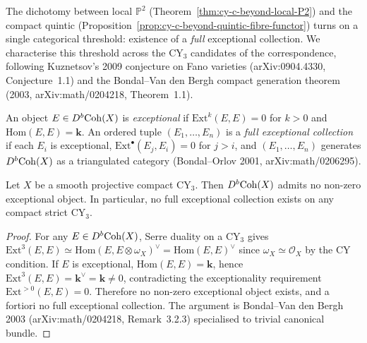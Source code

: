 The dichotomy between local $\mathbb{P}^2$ (Theorem~\ref{thm:cy-c-beyond-local-P2})
and the compact quintic
(Proposition~\ref{prop:cy-c-beyond-quintic-fibre-functor}) turns on a single
categorical threshold: existence of a \emph{full} exceptional collection. We
characterise this threshold across the CY$_3$ candidates of the correspondence,
following Kuznetsov's 2009 conjecture on Fano varieties
(arXiv:0904.4330, Conjecture~1.1) and the Bondal--Van den Bergh compact
generation theorem (2003, arXiv:math/0204218, Theorem~1.1).

\begin{definition}
\label{def:cy-c-beyond-full-exc-coll}
An object $E \in D^b\mathrm{Coh}(X)$ is \emph{exceptional} if
$\mathrm{Ext}^k(E, E) = 0$ for $k > 0$ and $\mathrm{Hom}(E, E) = \mathbf k$.
An ordered tuple $(E_1, \ldots, E_n)$ is a \emph{full exceptional collection}
if each $E_i$ is exceptional, $\mathrm{Ext}^\bullet(E_j, E_i) = 0$ for $j > i$,
and $(E_1, \ldots, E_n)$ generates $D^b\mathrm{Coh}(X)$ as a triangulated category
(Bondal--Orlov 2001, arXiv:math/0206295).
\end{definition}

\begin{lemma}
\label{lem:cy-c-beyond-cy3-obstruction}
Let $X$ be a smooth projective compact CY$_3$. Then $D^b\mathrm{Coh}(X)$ admits no
non-zero exceptional object. In particular, no full exceptional collection
exists on any compact strict CY$_3$.
\end{lemma}

\begin{proof}
For any $E \in D^b\mathrm{Coh}(X)$, Serre duality on a CY$_3$ gives
$\mathrm{Ext}^3(E, E) \simeq \mathrm{Hom}(E, E \otimes \omega_X)^\vee =
\mathrm{Hom}(E, E)^\vee$ since $\omega_X \simeq \mathcal O_X$ by the
CY condition. If $E$ is exceptional, $\mathrm{Hom}(E, E) = \mathbf k$, hence
$\mathrm{Ext}^3(E, E) = \mathbf k^\vee = \mathbf k \neq 0$, contradicting
the exceptionality requirement $\mathrm{Ext}^{>0}(E, E) = 0$. Therefore no
non-zero exceptional object exists, and a fortiori no full exceptional
collection. The argument is Bondal--Van den Bergh 2003
(arXiv:math/0204218, Remark~3.2.3) specialised to trivial canonical bundle.
\end{proof}

